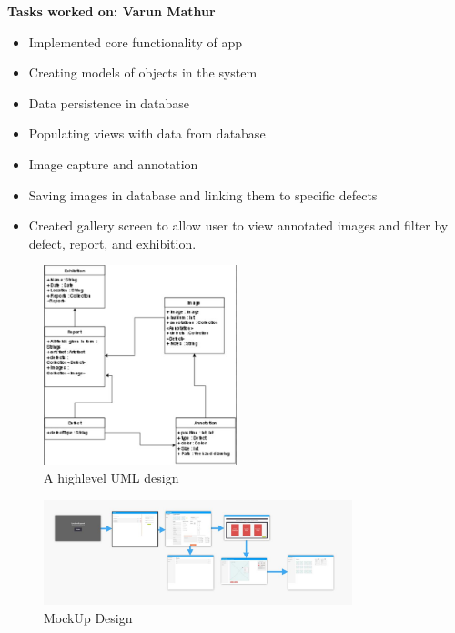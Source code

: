 \documentclass[12pt]{article}
\begin{document}
\textbf{ Tasks worked on: Varun Mathur}
\begin{itemize}
\item Implemented core functionality of app
\item Creating models of objects in the system
\item Data persistence in database
\item Populating views with data from database
\item Image capture and annotation
\item Saving images in database and linking them to specific defects
\item Created gallery screen to allow user to view annotated images and filter by defect, report, and exhibition.
\end{itemize}

\newpage	
\begin{figure}[t]
\vspace{0cm}\hspace*{4cm}\includegraphics[width=0.5\textwidth]{uml}
\caption{A highlevel UML design}
\end{figure}
\begin{figure}
\vspace{-2.5cm}\hspace*{1.5cm}\includegraphics[width=0.8\textwidth]{mockup}
\caption{MockUp Design}
\end{figure}
\end{document}
